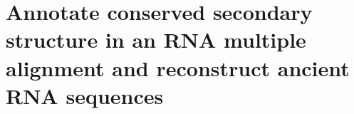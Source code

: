 \chapter{Annotate conserved secondary structure in an RNA multiple alignment and reconstruct ancient RNA sequences}
